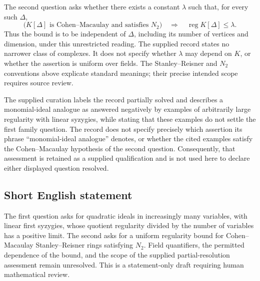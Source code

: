 \documentclass[11pt]{article}
\begin{document}
The second question asks whether there exists a constant \(\lambda\) such that, for every such \(\Delta\),
\[
\bigl(K[\Delta]\text{ is Cohen--Macaulay and satisfies }N_2\bigr)
\quad\Longrightarrow\quad
\operatorname{reg}K[\Delta]\le\lambda.
\]
Thus the bound is to be independent of \(\Delta\), including its number of vertices and dimension, under this unrestricted reading. The supplied record states no narrower class of complexes. It does not specify whether \(\lambda\) may depend on \(K\), or whether the assertion is uniform over fields. The Stanley--Reisner and \(N_2\) conventions above explicate standard meanings; their precise intended scope requires source review.

The supplied curation labels the record partially solved and describes a monomial-ideal analogue as answered negatively by examples of arbitrarily large regularity with linear syzygies, while stating that these examples do not settle the first family question. The record does not specify precisely which assertion its phrase ``monomial-ideal analogue'' denotes, or whether the cited examples satisfy the Cohen--Macaulay hypothesis of the second question. Consequently, that assessment is retained as a supplied qualification and is not used here to declare either displayed question resolved.
\subsection{Short English statement}
The first question asks for quadratic ideals in increasingly many variables, with linear first syzygies, whose quotient regularity divided by the number of variables has a positive limit. The second asks for a uniform regularity bound for Cohen--Macaulay Stanley--Reisner rings satisfying \(N_2\). Field quantifiers, the permitted dependence of the bound, and the scope of the supplied partial-resolution assessment remain unresolved. This is a statement-only draft requiring human mathematical review.
\end{document}
